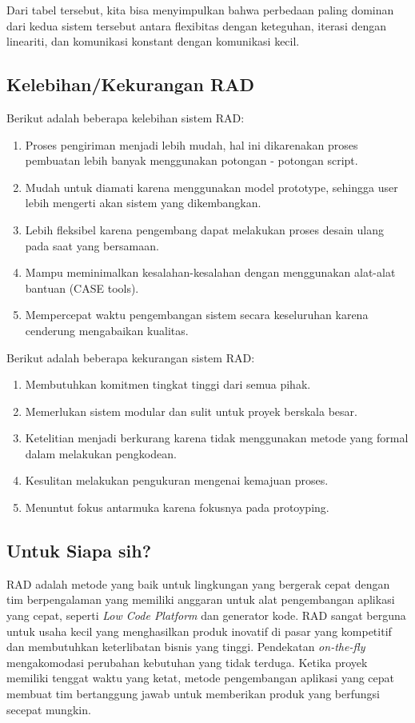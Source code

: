 \newpage

Dari tabel tersebut, kita bisa menyimpulkan bahwa perbedaan paling dominan dari kedua sistem tersebut
antara flexibitas dengan keteguhan, iterasi dengan lineariti, dan komunikasi konstant dengan
komunikasi kecil.

\subsection{Kelebihan/Kekurangan RAD}
Berikut adalah beberapa kelebihan sistem RAD:\cite[See p.75]{agustinus}

\begin{enumerate}
    \item Proses pengiriman menjadi lebih mudah, hal ini dikarenakan proses pembuatan lebih banyak menggunakan potongan - potongan script.
    \item Mudah untuk diamati karena menggunakan model prototype, sehingga user lebih mengerti akan sistem yang dikembangkan.
    \item Lebih fleksibel karena pengembang dapat melakukan proses desain ulang pada saat yang bersamaan.
    \item Mampu meminimalkan kesalahan-kesalahan dengan menggunakan alat-alat bantuan (CASE tools).
    \item Mempercepat waktu pengembangan sistem secara keseluruhan karena cenderung mengabaikan kualitas.
\end{enumerate}

Berikut adalah beberapa kekurangan sistem RAD:

\begin{enumerate}
    \item Membutuhkan komitmen tingkat tinggi dari semua pihak.
    \item Memerlukan sistem modular dan sulit untuk proyek berskala besar.
    \item Ketelitian menjadi berkurang karena tidak menggunakan metode yang formal dalam melakukan pengkodean.
    \item Kesulitan melakukan pengukuran mengenai kemajuan proses.
    \item Menuntut fokus antarmuka karena fokusnya pada protoyping.
\end{enumerate}

\subsection{Untuk Siapa sih?}
RAD adalah metode yang baik untuk lingkungan yang bergerak 
cepat dengan tim berpengalaman yang memiliki anggaran untuk 
alat pengembangan aplikasi yang cepat, seperti \emph{Low Code Platform} 
dan generator kode. RAD sangat berguna untuk usaha kecil 
yang menghasilkan produk inovatif di pasar yang kompetitif 
dan membutuhkan keterlibatan bisnis yang tinggi. Pendekatan \emph{on-the-fly} 
mengakomodasi perubahan kebutuhan yang tidak terduga. Ketika proyek 
memiliki tenggat waktu yang ketat, metode pengembangan aplikasi yang cepat 
membuat tim bertanggung jawab untuk memberikan produk yang berfungsi secepat mungkin.

